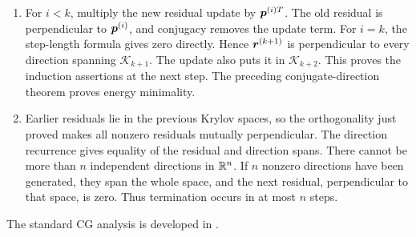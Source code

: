 \documentclass[../main.tex]{subfiles}
\begin{document}
{\begin{enumerate}
\begin{align*}
 \bp^{(k)T}\br^{(k)}
 =\|\br^{(k)}\|_2^2+\beta_{k-1}\bp^{(k-1)T}\br^{(k)}
 =\|\br^{(k)}\|_2^2.
\end{align*}
Thus exact line minimization gives the algorithm's stated $\alpha_k$. Its denominator is positive because $\bA$ is SPD and $\bp^{(k)}\neq\bzero$.
\item For $i<k$, multiply the new residual update by $\boldsymbol{p}^{(i)T}$. The old residual is perpendicular to $\boldsymbol{p}^{(i)}$, and conjugacy removes the update term. For $i=k$, the step-length formula gives zero directly. Hence $\boldsymbol{r}^{(k+1)}$ is perpendicular to every direction spanning $\mathcal K_{k+1}$. The update also puts it in $\mathcal K_{k+2}$. This proves the induction assertions at the next step. The preceding conjugate-direction theorem proves energy minimality.
\item Earlier residuals lie in the previous Krylov spaces, so the orthogonality just proved makes all nonzero residuals mutually perpendicular. The direction recurrence gives equality of the residual and direction spans. There cannot be more than $n$ independent directions in $\mathbb{R}^n$. If $n$ nonzero directions have been generated, they span the whole space, and the next residual, perpendicular to that space, is zero. Thus termination occurs in at most $n$ steps.
\end{enumerate}
The standard CG analysis is developed in \citet{saad2003}.
}
\end{document}
